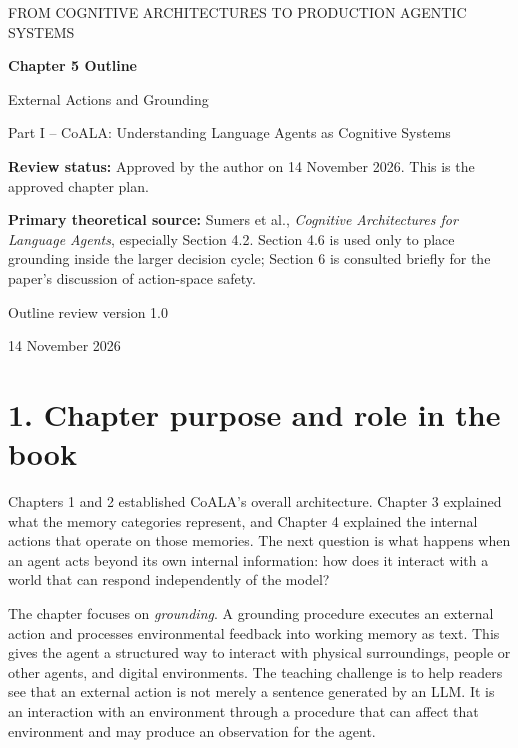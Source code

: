 


\thispagestyle{empty}
\begin{center}
{\sffamily\Large\color{BookBlue} FROM COGNITIVE ARCHITECTURES TO PRODUCTION AGENTIC SYSTEMS\par}
\vspace{1.2cm}
{\sffamily\huge\bfseries\color{BookBlue} Chapter 5 Outline\par}
\vspace{0.45cm}
{\sffamily\LARGE External Actions and Grounding\par}
\vspace{0.8cm}
{\large Part I -- CoALA: Understanding Language Agents as Cognitive Systems\par}
\vfill
\begin{learningbox}
\textbf{Review status:} Approved by the author on 14 November 2026. This is the approved chapter plan.

\textbf{Primary theoretical source:} Sumers et al., \emph{Cognitive Architectures for Language Agents}, especially Section 4.2. Section 4.6 is used only to place grounding inside the larger decision cycle; Section 6 is consulted briefly for the paper's discussion of action-space safety.
\end{learningbox}
\vfill
{\sffamily\large Outline review version 1.0\par}
{\small 14 November 2026\par}
\end{center}
\clearpage

\section*{1. Chapter purpose and role in the book}
Chapters 1 and 2 established CoALA's overall architecture. Chapter 3 explained what the memory categories represent, and Chapter 4 explained the internal actions that operate on those memories. The next question is what happens when an agent acts beyond its own internal information: how does it interact with a world that can respond independently of the model?

The chapter focuses on \emph{grounding}. A grounding procedure executes an external action and processes environmental feedback into working memory as text. This gives the agent a structured way to interact with physical surroundings, people or other agents, and digital environments. The teaching challenge is to help readers see that an external action is not merely a sentence generated by an LLM. It is an interaction with an environment through a procedure that can affect that environment and may produce an observation for the agent.


